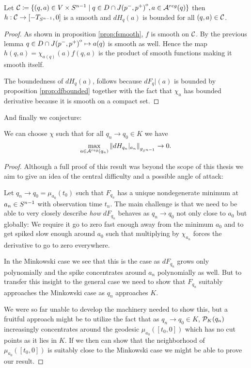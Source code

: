 \begin{corollary}\label{cor:hsmooth}
    Let ${\mathcal{C}}\coloneqq \{(q,a)\in V\times {S^{n-1}} \mid q \in D\cap {\kern0ptJ(p^-,p^+)}^{\mathrm{o}}, a\in {{\mathcal{A}}^{reg}}(q)\}$ then $h:{\mathcal{C}}\to [-T_{S^{n-1}},0]$ is a smooth and $dH_q(a)$ is bounded for all $(q,a)\in {\mathcal{C}}$.
\end{corollary}
\begin{proof}
    As shown in proposition \ref{prop:fsmooth}, $f$ is smooth on ${\mathcal{C}}$. By the previous lemma $q\in D\cap {\kern0ptJ(p^-,p^+)}^{\mathrm{o}}\mapsto a(q)$ is smooth as well.
    Hence the map $h(q,a) = \chi_{a(q)}(a)f(q,a)$ is the product of smooth functions making it smooth itself.

    The boundedness of $dH_q(a)$, follows because $dF_q\rvert(a)$ is bounded by proposition \ref{prop:dfbounded} together with the fact that $\chi_{a}$ has bounded derivative because it is smooth on a compact set.
\end{proof}

And finally we conjecture:
\begin{conjecture}\label{conj:dhconvonboundary}
    We can choose $\chi$ such that for all $q_n \to q_0\in K$ we have
    \[
        \max_{a\in {{\mathcal{A}}^{reg}}(q_n)} \left\lVert dH_{q_n}\rvert_{a_n}\right\rVert_{g_{S^{n-1}}}\to 0.
    \]
\end{conjecture}
\begin{proof}
    Although a full proof of this result was beyond the scope of this thesis we aim to give an idea of the central difficulty and a possible angle of attack:

    Let $q_n\to q_0=\mu_{a_0}(t_0)$ such that $F_{q_n}$ has a unique nondegenerate minimum at $a_n\in {S^{n-1}}$ with observation time $t_n$.
    The main challenge is that we need to be able to very closely describe \emph{how} $dF_{q_n}$ behaves as $q_n\to q_0$ not only close to $a_0$ but globally: We require it go to zero fast enough away from the minimum $a_0$ and to get spiked slow enough around $a_0$ such that multiplying by $\chi_{a_n}$ forces the derivative to go to zero everywhere.

    In the Minkowski case we see that this is the case as $dF_{q_n}$ grows only polynomially and the spike concentrates around $a_n$ polynomially as well. But to transfer this insight to the general case we need to show that $F_{q_n}$ suitably approaches the Minkowski case as $q_n$ approaches $K$. 

    We were so far unable to develop the machinery needed to show this, but a fruitful approach might be to utilize the fact that as $q_n \to q_0\in K$, ${\mathcal{P}}_K(q_n)$ increasingly concentrates around the geodesic $\mu_{a_0}([t_0,0])$ which has no cut points as it lies in $K$. If we then can show that the neighborhood of $\mu_{a_0}([t_0,0])$ is suitably close to the Minkowski case we might be able to prove our result.
\end{proof}

